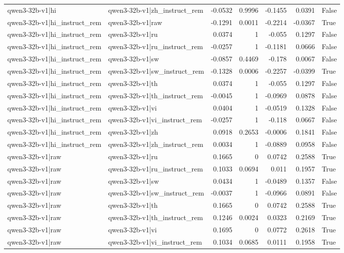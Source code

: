 \begin{table}
\begin{tabular}{l l r r r r l}
qwen3-32b-v1|hi & qwen3-32b-v1|zh_instruct_rem & -0.0532 & 0.9996 & -0.1455 & 0.0391 & False \\
qwen3-32b-v1|hi_instruct_rem & qwen3-32b-v1|raw & -0.1291 & 0.0011 & -0.2214 & -0.0367 & True \\
qwen3-32b-v1|hi_instruct_rem & qwen3-32b-v1|ru & 0.0374 & 1 & -0.055 & 0.1297 & False \\
qwen3-32b-v1|hi_instruct_rem & qwen3-32b-v1|ru_instruct_rem & -0.0257 & 1 & -0.1181 & 0.0666 & False \\
qwen3-32b-v1|hi_instruct_rem & qwen3-32b-v1|sw & -0.0857 & 0.4469 & -0.178 & 0.0067 & False \\
qwen3-32b-v1|hi_instruct_rem & qwen3-32b-v1|sw_instruct_rem & -0.1328 & 0.0006 & -0.2257 & -0.0399 & True \\
qwen3-32b-v1|hi_instruct_rem & qwen3-32b-v1|th & 0.0374 & 1 & -0.055 & 0.1297 & False \\
qwen3-32b-v1|hi_instruct_rem & qwen3-32b-v1|th_instruct_rem & -0.0045 & 1 & -0.0969 & 0.0878 & False \\
qwen3-32b-v1|hi_instruct_rem & qwen3-32b-v1|vi & 0.0404 & 1 & -0.0519 & 0.1328 & False \\
qwen3-32b-v1|hi_instruct_rem & qwen3-32b-v1|vi_instruct_rem & -0.0257 & 1 & -0.118 & 0.0667 & False \\
qwen3-32b-v1|hi_instruct_rem & qwen3-32b-v1|zh & 0.0918 & 0.2653 & -0.0006 & 0.1841 & False \\
qwen3-32b-v1|hi_instruct_rem & qwen3-32b-v1|zh_instruct_rem & 0.0034 & 1 & -0.0889 & 0.0958 & False \\
qwen3-32b-v1|raw & qwen3-32b-v1|ru & 0.1665 & 0 & 0.0742 & 0.2588 & True \\
qwen3-32b-v1|raw & qwen3-32b-v1|ru_instruct_rem & 0.1033 & 0.0694 & 0.011 & 0.1957 & True \\
qwen3-32b-v1|raw & qwen3-32b-v1|sw & 0.0434 & 1 & -0.0489 & 0.1357 & False \\
qwen3-32b-v1|raw & qwen3-32b-v1|sw_instruct_rem & -0.0037 & 1 & -0.0966 & 0.0891 & False \\
qwen3-32b-v1|raw & qwen3-32b-v1|th & 0.1665 & 0 & 0.0742 & 0.2588 & True \\
qwen3-32b-v1|raw & qwen3-32b-v1|th_instruct_rem & 0.1246 & 0.0024 & 0.0323 & 0.2169 & True \\
qwen3-32b-v1|raw & qwen3-32b-v1|vi & 0.1695 & 0 & 0.0772 & 0.2618 & True \\
qwen3-32b-v1|raw & qwen3-32b-v1|vi_instruct_rem & 0.1034 & 0.0685 & 0.0111 & 0.1958 & True \\

\end{tabular}
\end{table}
